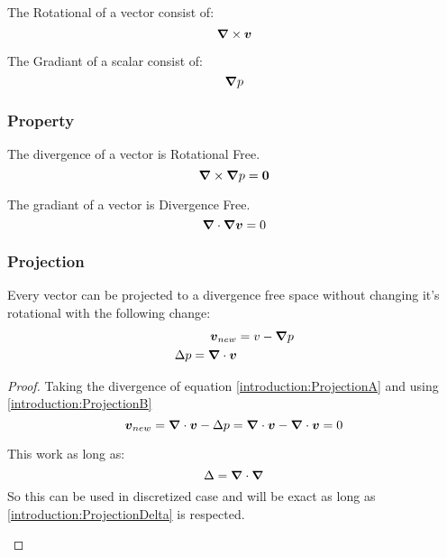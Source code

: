 \begin{definition}
 The Rotational of a vector consist of:
 \begin{equation}
  {\boldsymbol \nabla} \times {\boldsymbol v}
 \end{equation}
\end{definition}

\begin{definition}
 The Gradiant of a scalar consist of:
 \begin{equation}
  {\boldsymbol \nabla} p
 \end{equation}
\end{definition}

\subsubsection{Property}

\begin{property}
 The divergence of a vector is Rotational Free.
 \begin{equation}
  {\boldsymbol \nabla}\times {\boldsymbol \nabla} p={\boldsymbol 0}
 \end{equation}
\end{property}

\begin{property}
 The gradiant of a vector is Divergence Free.
 \begin{equation}
  {\boldsymbol \nabla}\cdot {\boldsymbol \nabla} {\boldsymbol v}=0
 \end{equation}
\end{property}
\subsubsection{Projection}

\label{introduction:projection}
\begin{property}
 Every vector can be projected to a divergence free space without changing it's rotational with the following change:
\begin{align}
 {\boldsymbol v_{new}}&=v-{\boldsymbol \nabla}p \label{introduction:ProjectionA}\\
 \Delta p={\boldsymbol \nabla} \cdot {\boldsymbol v} \label{introduction:ProjectionB}
\end{align}
\end{property}
\begin{proof}
  Taking the divergence of equation \ref{introduction:ProjectionA} and using \ref{introduction:ProjectionB}
  \begin{equation}
   {\boldsymbol v_{new}}={\boldsymbol \nabla}\cdot{\boldsymbol v}-\Delta p={\boldsymbol \nabla}\cdot{\boldsymbol v}-{\boldsymbol \nabla}\cdot{\boldsymbol v}=0
  \end{equation}
  \begin{rem}
 This work as long as:
 \begin{equation}
  \Delta={\boldsymbol \nabla}\cdot {\boldsymbol \nabla}\label{introduction:ProjectionDelta}
 \end{equation}
 So this can be used in discretized case and will be exact as long as \ref{introduction:ProjectionDelta} is respected.
 \end{rem}
\end{proof}

